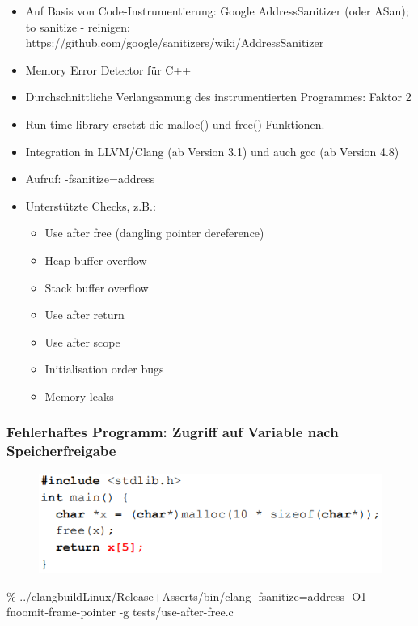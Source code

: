 \documentclass[openany]{book}
\begin{document}
\begin{itemize}
    \item Auf Basis von Code-Instrumentierung: Google AddressSanitizer (oder ASan); to sanitize - reinigen:  https://github.com/google/sanitizers/wiki/AddressSanitizer
    \item Memory Error Detector für C++
    \item Durchschnittliche Verlangsamung des instrumentierten Programmes: Faktor 2
    \item Run-time library ersetzt die malloc() und free() Funktionen.
    \item Integration in LLVM/Clang (ab Version 3.1) und auch gcc (ab Version 4.8)
    \item Aufruf: -fsanitize=address
    \item Unterstützte Checks, z.B.:
    \begin{itemize}
        \item Use after free (dangling pointer dereference)
        \item Heap buffer overflow
        \item Stack buffer overflow
        \item Use after return
        \item Use after scope
        \item Initialisation order bugs
        \item Memory leaks
    \end{itemize}
\end{itemize}

\subsubsection{Fehlerhaftes Programm: Zugriff auf Variable nach Speicherfreigabe}

\begin{figure}[h!]
    \centering
    \includegraphics[width=0.85\linewidth]{Pics/MemoryError.PNG}
\end{figure}

\% ../clang\textunderscore build\textunderscore Linux/Release+Asserts/bin/clang -fsanitize=address -O1 -fnoomit-frame-pointer -g tests/use-after-free.c
\end{document}
